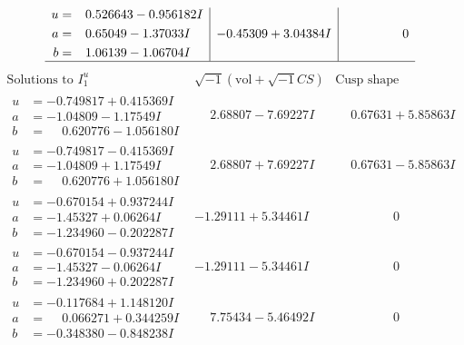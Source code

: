 \documentclass[1p]{elsarticle_modified}
\theoremstyle{definition}
\newcommand{\I}{\sqrt{-1}}
\begin{document}
$$\begin{array}{c|c|c}
\begin{aligned}
u &= \phantom{-}0.526643 - 0.956182 I \\
a &= \phantom{-}0.65049 - 1.37033 I \\
b &= \phantom{-}1.06139 - 1.06704 I\end{aligned}
 & -0.45309 + 3.04384 I & \phantom{-0.000000 } 0\\
 \hline 
 \end{array}$$\newpage$$\begin{array}{c|c|c}  
\text{Solutions to }I^u_{1}& \I (\text{vol} + \sqrt{-1}CS) & \text{Cusp shape}\\
 \hline 
\begin{aligned}
u &= -0.749817 + 0.415369 I \\
a &= -1.04809 - 1.17549 I \\
b &= \phantom{-}0.620776 - 1.056180 I\end{aligned}
 & \phantom{-}2.68807 - 7.69227 I & \phantom{-}0.67631 + 5.85863 I \\ \hline\begin{aligned}
u &= -0.749817 - 0.415369 I \\
a &= -1.04809 + 1.17549 I \\
b &= \phantom{-}0.620776 + 1.056180 I\end{aligned}
 & \phantom{-}2.68807 + 7.69227 I & \phantom{-}0.67631 - 5.85863 I \\ \hline\begin{aligned}
u &= -0.670154 + 0.937244 I \\
a &= -1.45327 + 0.06264 I \\
b &= -1.234960 - 0.202287 I\end{aligned}
 & -1.29111 + 5.34461 I & \phantom{-0.000000 } 0 \\ \hline\begin{aligned}
u &= -0.670154 - 0.937244 I \\
a &= -1.45327 - 0.06264 I \\
b &= -1.234960 + 0.202287 I\end{aligned}
 & -1.29111 - 5.34461 I & \phantom{-0.000000 } 0 \\ \hline\begin{aligned}
u &= -0.117684 + 1.148120 I \\
a &= \phantom{-}0.066271 + 0.344259 I \\
b &= -0.348380 - 0.848238 I\end{aligned}
 & \phantom{-}7.75434 - 5.46492 I & \phantom{-0.000000 } 0 \\ \hline\begin{aligned}

\end{aligned}
\end{array}$$
\end{document}
